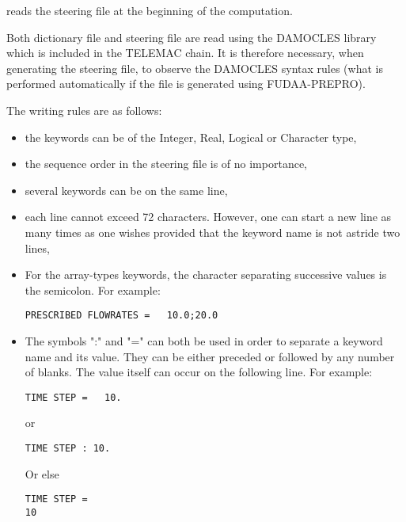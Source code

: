  reads the steering file at the beginning of the computation.

Both dictionary file and steering file are read using the DAMOCLES library
which is included in the TELEMAC chain. It is therefore necessary, when
generating the steering file, to observe the DAMOCLES syntax rules (what is
performed automatically if the file is generated using FUDAA-PREPRO).

The writing rules are as follows:

\begin{itemize}
\item the keywords can be of the Integer, Real, Logical or Character type,

\item the sequence order in the steering file is of no importance,

\item several keywords can be on the same line,

\item each line cannot exceed 72 characters. However, one can start a new line
as many times as one wishes provided that the keyword name is not astride two
lines,

\item For the array-types keywords, the character separating successive values
is the semicolon. For example:

\begin{lstlisting}[language=TelemacCas]
PRESCRIBED FLOWRATES =   10.0;20.0
\end{lstlisting}

\item The symbols ":" and "=" can both be used in order to separate a keyword
name and its value. They can be either preceded or followed by any number of
blanks. The value itself can occur on the following line. For example:

\begin{lstlisting}[language=TelemacCas]
TIME STEP =   10.
\end{lstlisting}

or

\begin{lstlisting}[language=TelemacCas]
TIME STEP : 10.
\end{lstlisting}

Or else

\begin{lstlisting}[language=TelemacCas]
TIME STEP =
10
\end{lstlisting}


\end{itemize}
